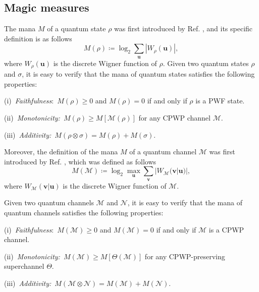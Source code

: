 \documentclass[aps,pra,twocolumn,floatfix,amsfonts,10pt]{revtex4-2}
\begin{document}
\subsection{Magic measures}
The mana $M$ of a quantum state $\rho$ was first introduced by Ref. \cite{VMG+2014}, and its specific definition is as follows
\begin{equation}\label{definition of state mana}
	M(\rho) \coloneqq \log_2 \displaystyle\sum_{\mathbf{u}} |W_{\rho}(\mathbf{u})|,
\end{equation}
where $W_{\rho}(\mathbf{u})$ is the discrete Wigner function of $\rho$.
Given two quantum states $\rho$ and $\sigma$, it is easy to verify that the mana of quantum states satisfies the following properties:

(i)~\emph{Faithfulness}:~$M(\rho) \geqslant 0$ and $M(\rho) = 0$ if and only if $\rho$ is a PWF state.

(ii)~\emph{Monotonicity:}~$M(\rho) \geqslant M[\mathcal{M}(\rho)]$ for any CPWP channel $\mathcal{M}$.

(iii)~\emph{Additivity:}~$M(\rho \otimes \sigma) = M(\rho) + M(\sigma)$.

Moreover, the definition of the mana $M$ of a quantum channel $\mathcal{M}$ was first introduced by Ref. \cite{WWS2019}, which was defined as follows
\begin{equation}
	M(\mathcal{M}) \coloneqq \log_2 \max_{\mathbf{u}} \displaystyle\sum_{\mathbf{v}} |W_{\mathcal{M}}(\mathbf{v}|\mathbf{u})|,
\end{equation}
where $W_{\mathcal{M}}(\mathbf{v}|\mathbf{u})$ is the discrete Wigner function of $\mathcal{M}$.

Given two quantum channels $\mathcal{M}$ and $\mathcal{N}$, it is easy to verify that the mana of quantum channels satisfies the following properties:

(i)~\emph{Faithfulness}:~$M(\mathcal{M}) \geqslant 0$ and $M(\mathcal{M}) = 0$ if and only if $\mathcal{M}$ is a CPWP channel.

(ii)~\emph{Monotonicity:}~$M(\mathcal{M}) \geqslant M[\Theta(\mathcal{M})]$ for any CPWP-preserving superchannel $\Theta$.

(iii)~\emph{Additivity:}~$M(\mathcal{M} \otimes \mathcal{N}) = M(\mathcal{M}) + M(\mathcal{N})$.
\end{document}
